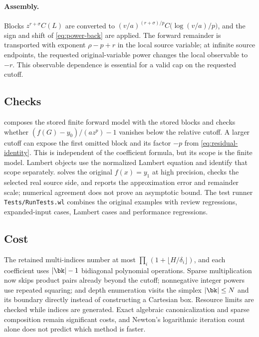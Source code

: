 \paragraph{Assembly.} Blocks $z^{r+\sigma}C(L)$ are converted to $(v/a)^{(r+\sigma)/p}C\bigl(\log(v/a)/p\bigr)$, and the sign and shift of \eqref{eq:power-back} are applied. The forward remainder is transported with exponent $\rho-p+r$ in the local source variable; at infinite source endpoints, the requested original-variable power changes the local observable to $-r$. This observable dependence is essential for a valid cap on the requested cutoff.

\subsection{Checks}

 composes the stored finite forward model with the stored blocks and checks whether $(f(G)-y_0)/(az^p)-1$ vanishes below the relative cutoff. A larger cutoff can expose the first omitted block and its factor $-p$ from \eqref{eq:residual-identity}. This is independent of the coefficient formula, but its scope is the finite model. Lambert objects use the normalized Lambert equation and identify that scope separately.  solves the original $f(x)=y_1$ at high precision, checks the selected real source side, and reports the approximation error and remainder scale; numerical agreement does not prove an asymptotic bound. The test runner \texttt{Tests/RunTests.wl} combines the original examples with review regressions, expanded-input cases, Lambert cases and performance regressions.

\subsection{Cost}

The retained multi-indices number at most $\prod_i(1+\lfloor H/\delta_i\rfloor)$, and each coefficient uses $|\bk|-1$ bidiagonal polynomial operations. Sparse multiplication now skips product pairs already beyond the cutoff; nonnegative integer powers use repeated squaring; and depth enumeration visits the simplex $|\bk|\le N$ and its boundary directly instead of constructing a Cartesian box. Resource limits are checked while indices are generated. Exact algebraic canonicalization and sparse composition remain significant costs, and Newton's logarithmic iteration count alone does not predict which method is faster.

